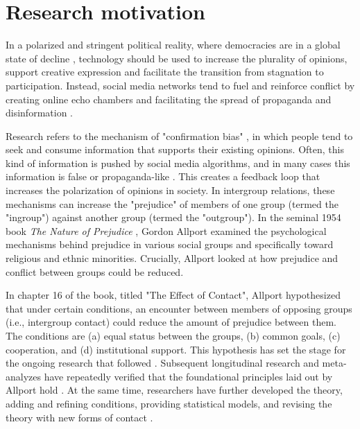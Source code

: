 \documentclass[dissertation,math,vertlayout,pdfa,colorlinks]{aaltoseries}
\begin{document}
\section{Research motivation}
In a polarized and stringent political reality, where democracies are in a global state of decline \cite{nordDemocracyReport20252025}, technology should be used to increase the plurality of opinions, support creative expression and facilitate the transition from stagnation to participation. Instead, social media networks tend to fuel and reinforce conflict by creating online echo chambers and facilitating the spread of propaganda and disinformation \cite{xingDivingDivideSystematic2024}.

Research refers to the mechanism of "confirmation bias" \cite{knobloch-westerwickConfirmationBiasIngroup2020}, in which people tend to seek and consume information that supports their existing opinions. Often, this kind of information is pushed by social media algorithms, and in many cases this information is false or propaganda-like \cite{eckerDigitalReinforcementBias2025}. This creates a feedback loop that increases the polarization of opinions in society. In intergroup relations, these mechanisms can increase the "prejudice" of members of one group (termed the "ingroup") against another group (termed the "outgroup"). In the seminal 1954 book \textit{The Nature of Prejudice} \cite{allportNaturePrejudice1954}, Gordon Allport examined the psychological mechanisms behind prejudice in various social groups and specifically toward religious and ethnic minorities. Crucially, Allport looked at how prejudice and conflict between groups could be reduced. 

In chapter 16 of the book, titled "The Effect of Contact", Allport hypothesized that under certain conditions, an encounter between members of opposing groups (i.e., intergroup contact) could reduce the amount of prejudice between them. The conditions are (a) equal status between the groups, (b) common goals, (c) cooperation, and (d) institutional support. This hypothesis has set the stage for the ongoing research that followed \cite{pettigrewAllportsIntergroupContact2005}. Subsequent longitudinal research and meta-analyzes have repeatedly verified that the foundational principles laid out by Allport hold \cite{pettigrewMetaanalyticTestIntergroup2006, pettigrewIntergroupContactTheory1998, pettigrewDoesIntergroupContact2013}. At the same time, researchers have further developed the theory, adding and refining conditions, providing statistical models, and revising the theory with new forms of contact \cite{pettigrewAdvancingIntergroupContact2021}.
\end{document}
